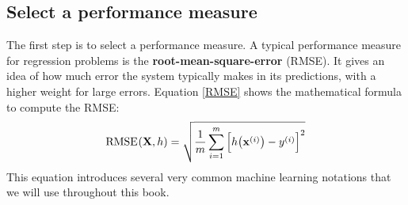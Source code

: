 \subsection{Select a performance measure}
The first step is to select a performance measure. A typical performance measure for regression problems is the \textbf{root-mean-square-error} (RMSE). It gives an idea of how much error the system typically makes in its predictions, with a higher weight for large errors. Equation \eqref{RMSE} shows the mathematical formula to compute the RMSE:
\begin{equation}\label{RMSE}
\operatorname{RMSE}\mspace{1mu}(\mathbf{X},h)=\sqrt{\frac{1}{m}\sum_{i=1}^m{\Bigl[h\bigl(\mathbf{x}^{(i)}\bigr)-y^{(i)}\Bigr]}^2}
\end{equation}
This equation introduces several very common machine learning notations that we will use throughout this book.
